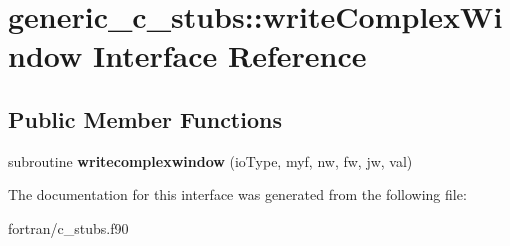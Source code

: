 \hypertarget{interfacegeneric__c__stubs_1_1write_complex_window}{}\section{generic\+\_\+c\+\_\+stubs\+:\+:write\+Complex\+Window Interface Reference}
\label{interfacegeneric__c__stubs_1_1write_complex_window}
\subsection*{Public Member Functions}
\begin{DoxyCompactItemize}
\item 
\mbox{\label{interfacegeneric__c__stubs_1_1write_complex_window_af6bd1ce7277b86b68c897fe6412291d0}} 
subroutine {\bfseries writecomplexwindow} (io\+Type, myf, nw, fw, jw, val)
\end{DoxyCompactItemize}


The documentation for this interface was generated from the following file\+:\begin{DoxyCompactItemize}
\item 
fortran/c\+\_\+stubs.\+f90\end{DoxyCompactItemize}

